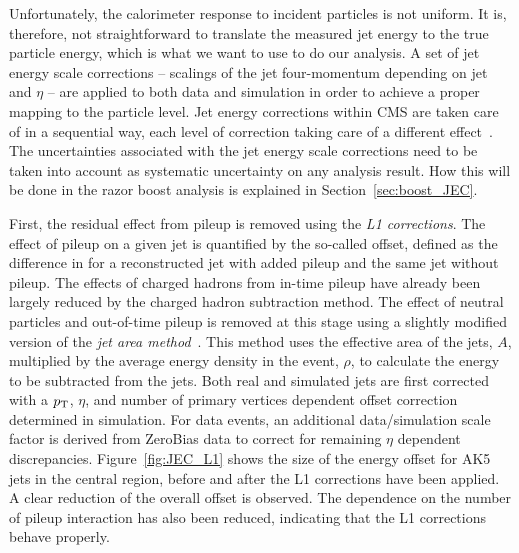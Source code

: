 Unfortunately, the calorimeter response to incident particles is not uniform. It is, therefore, not
straightforward to translate the measured jet energy to the true particle energy, which is what we
want to use to do our analysis. A set of jet energy scale corrections -- scalings of the
jet four-momentum depending on jet \pt and $\eta$ -- are applied to both data and
simulation in order to achieve a proper mapping to the particle level. 
Jet energy corrections within CMS are taken care of in a sequential way, each level of correction
taking care of a different effect~\cite{JEC,Chatrchyan:2011ds}. 
The uncertainties associated with the jet energy scale corrections need to be taken into account as
systematic uncertainty on any analysis result. How this will be done in the razor boost analysis is
explained in Section~\ref{sec:boost_JEC}.  

First, the residual effect from pileup is removed using the \textit{L1 corrections}. 
The effect of pileup on a given jet is quantified by the so-called offset, defined as the
difference in \pt for a reconstructed jet with added pileup and the same jet without pileup.
The effects of charged hadrons from in-time pileup have already been largely reduced by the charged
hadron subtraction method. The effect of neutral particles and out-of-time pileup is removed at this
stage using a slightly modified version of the \textit{jet area method}~\cite{Fastjet1,Fastjet2}.
This method uses the effective area of the jets, $A$, multiplied by the average energy density
in the event, $\rho$, to calculate the energy to be subtracted from the jets.
Both real and simulated jets are first corrected with a $p_{\mathrm{T}}$, $\eta$, and number of primary
vertices dependent offset correction determined in simulation. For data events, an additional
data/simulation scale factor is derived from ZeroBias data to correct for remaining $\eta$ dependent
discrepancies.
Figure~\ref{fig:JEC_L1} shows the size of the energy offset for AK5 jets in the central region,
before and after the L1 corrections have been applied. A clear reduction of the overall offset is
observed. The dependence on the number of pileup interaction has also been reduced, indicating that
the L1 corrections behave properly.  

